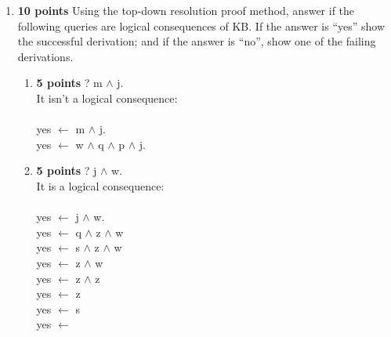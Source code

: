 \documentclass{article}
\def\ans#1{{\color{ans}#1}}
\begin{document}
\begin{enumerate}[label=(\alph*)]
\begin{enumerate}[label=\roman*.]
{        }
    \end{enumerate}
    \item \textbf{10 points} Using the top-down resolution proof method, answer if the following queries are logical consequences of KB. If the answer is “yes” show the successful derivation; and if the answer is “no”, show one of the failing derivations.\\
    \begin{enumerate}[label=\roman*.]
        \item \textbf{5 points} ? m $\wedge$ j.\\
        \ans{
          It isn't a logical consequence: \\ \\
          yes $\leftarrow$ m $\wedge$ j. \\
          yes $\leftarrow$ w $\wedge$ q $\wedge$ p $\wedge$ j. \\
          \fbox{yes $\leftarrow$ u $\wedge$ x $\wedge$ q $\wedge$ p  $\wedge$ j.}
      } 
        \item \textbf{5 points} ? j $\wedge$ w.\\
        \ans{
          It is a logical consequence: \\ \\
          yes $\leftarrow$ j $\wedge$ w. \\
          yes $\leftarrow$ q $\wedge$ z $\wedge$ w\\
          yes $\leftarrow$ s $\wedge$ z $\wedge$ w\\
          yes $\leftarrow$ z $\wedge$ w\\
          yes $\leftarrow$ z $\wedge$ z\\
          yes $\leftarrow$ z \\
          yes $\leftarrow$ s \\
          yes $\leftarrow$ 
      }
    \end{enumerate}
\end{enumerate}

\clearpage
\end{document}
